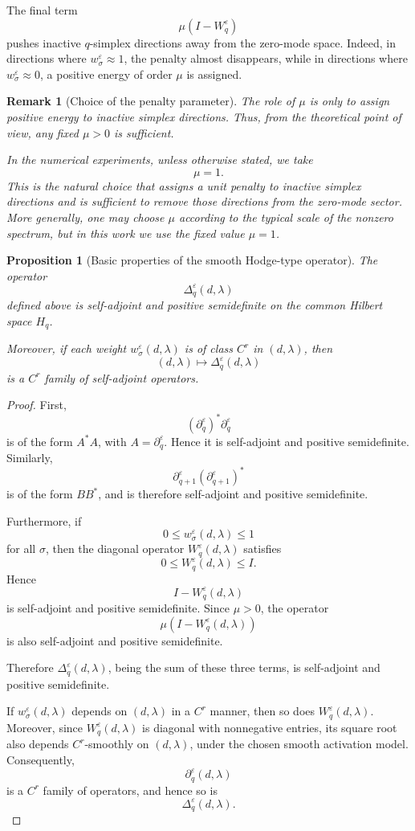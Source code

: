 \documentclass[10pt,a4paper]{amsart}
\newtheorem{proposition}[theorem]{Proposition}%
\newtheorem{remark}{Remark}%
\begin{document}
The final term
\[
\mu(I-W_q^\varepsilon)
\]
pushes inactive \(q\)-simplex directions away from the zero-mode space. Indeed,
in directions where \(w_\sigma^\varepsilon\approx 1\), the penalty almost
disappears, while in directions where \(w_\sigma^\varepsilon\approx 0\), a
positive energy of order \(\mu\) is assigned.

\begin{remark}[Choice of the penalty parameter]
The role of \(\mu\) is only to assign positive energy to inactive simplex
directions. Thus, from the theoretical point of view, any fixed \(\mu>0\) is
sufficient.

In the numerical experiments, unless otherwise stated, we take
\[
\mu=1.
\]
This is the natural choice that assigns a unit penalty to inactive simplex
directions and is sufficient to remove those directions from the zero-mode
sector. More generally, one may choose \(\mu\) according to the typical scale of
the nonzero spectrum, but in this work we use the fixed value \(\mu=1\).
\end{remark}

\begin{proposition}[Basic properties of the smooth Hodge-type operator]
The operator
\[
\Delta_q^\varepsilon(d,\lambda)
\]
defined above is self-adjoint and positive semidefinite on the common Hilbert
space \(H_q\).

Moreover, if each weight \(w_\sigma^\varepsilon(d,\lambda)\) is of class \(C^r\)
in \((d,\lambda)\), then
\[
(d,\lambda)\longmapsto \Delta_q^\varepsilon(d,\lambda)
\]
is a \(C^r\) family of self-adjoint operators.
\end{proposition}

\begin{proof}
First,
\[
(\partial_q^\varepsilon)^\ast\partial_q^\varepsilon
\]
is of the form \(A^\ast A\), with \(A=\partial_q^\varepsilon\). Hence it is
self-adjoint and positive semidefinite. Similarly,
\[
\partial_{q+1}^\varepsilon(\partial_{q+1}^\varepsilon)^\ast
\]
is of the form \(BB^\ast\), and is therefore self-adjoint and positive
semidefinite.

Furthermore, if
\[
0\le w_\sigma^\varepsilon(d,\lambda)\le 1
\]
for all \(\sigma\), then the diagonal operator \(W_q^\varepsilon(d,\lambda)\)
satisfies
\[
0\le W_q^\varepsilon(d,\lambda)\le I.
\]
Hence
\[
I-W_q^\varepsilon(d,\lambda)
\]
is self-adjoint and positive semidefinite. Since \(\mu>0\), the operator
\[
\mu(I-W_q^\varepsilon(d,\lambda))
\]
is also self-adjoint and positive semidefinite.

Therefore \(\Delta_q^\varepsilon(d,\lambda)\), being the sum of these three
terms, is self-adjoint and positive semidefinite.

If \(w_\sigma^\varepsilon(d,\lambda)\) depends on \((d,\lambda)\) in a \(C^r\)
manner, then so does \(W_q^\varepsilon(d,\lambda)\). Moreover, since
\(W_q^\varepsilon(d,\lambda)\) is diagonal with nonnegative entries, its square
root also depends \(C^r\)-smoothly on \((d,\lambda)\), under the chosen smooth
activation model. Consequently,
\[
\partial_q^\varepsilon(d,\lambda)
\]
is a \(C^r\) family of operators, and hence so is
\[
\Delta_q^\varepsilon(d,\lambda).
\]
\end{proof}
\end{document}
